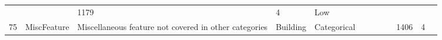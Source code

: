 \documentclass[11pt]{article}
\begin{document}
\begin{longtable}[]{@{}llllllllllll@{}}
\begin{minipage}[t]{0.04\columnwidth}
\strut
\end{minipage} & \begin{minipage}[t]{0.04\columnwidth}\raggedright\strut
\strut
\end{minipage} & \begin{minipage}[t]{0.04\columnwidth}\raggedright\strut
1179\strut
\end{minipage} & \begin{minipage}[t]{0.04\columnwidth}\raggedright\strut
4\strut
\end{minipage} & \begin{minipage}[t]{0.04\columnwidth}\raggedright\strut
Low\strut
\end{minipage}\tabularnewline
\begin{minipage}[t]{0.04\columnwidth}\raggedright\strut
75\strut
\end{minipage} & \begin{minipage}[t]{0.04\columnwidth}\raggedright\strut
MiscFeature\strut
\end{minipage} & \begin{minipage}[t]{0.04\columnwidth}\raggedright\strut
Miscellaneous feature not covered in other categories\strut
\end{minipage} & \begin{minipage}[t]{0.04\columnwidth}\raggedright\strut
Building\strut
\end{minipage} & \begin{minipage}[t]{0.04\columnwidth}\raggedright\strut
Categorical\strut
\end{minipage} & \begin{minipage}[t]{0.04\columnwidth}\raggedright\strut
\strut
\end{minipage} & \begin{minipage}[t]{0.04\columnwidth}\raggedright\strut
\strut
\end{minipage} & \begin{minipage}[t]{0.04\columnwidth}\raggedright\strut
\strut
\end{minipage} & \begin{minipage}[t]{0.04\columnwidth}\raggedright\strut
\strut
\end{minipage} & \begin{minipage}[t]{0.04\columnwidth}\raggedright\strut
1406\strut
\end{minipage} & \begin{minipage}[t]{0.04\columnwidth}\raggedright\strut
4\strut
\end{minipage} & \begin{minipage}[t]{0.04\columnwidth}\raggedright\strut

\end{minipage}
\end{longtable}
\end{document}
